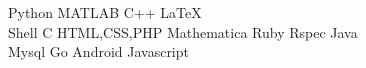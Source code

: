 \documentclass[hidelinks,letterpaper]{deedy-resume-openfont} %
\begin{document}
\begin{minipage}[t]{0.33\textwidth}
		
		Python \textbullet{} MATLAB \textbullet{} C++ \textbullet{} \LaTeX \\
        Shell \textbullet{} C \textbullet{} HTML,CSS,PHP \textbullet{} Mathematica 					\textbullet{} Ruby \textbullet{} Rspec \textbullet{} Java \\
        Mysql \textbullet{} Go \textbullet{} Android \textbullet{} Javascript
		
		
	\end{minipage} %
	\hfill
\end{document}
